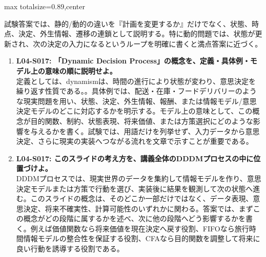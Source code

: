 \begin{minipage}[t]{0.58\textwidth}
\begin{adjustbox}{max totalsize={\textwidth}{0.89\textheight},center}
\begin{minipage}{\textwidth}
試験答案では、静的/動的の違いを『計画を変更するか』だけでなく、状態、時点、決定、外生情報、遷移の連鎖として説明する。特に動的問題では、状態が更新され、次の決定の入力になるというループを明確に書くと満点答案に近づく。\par{}\begin{enumerate}\item \textbf{L04-S017: 「Dynamic Decision Process」の概念を、定義・具体例・モデル上の意味の順に説明せよ。}\\定義としては、dynamismは、時間の進行により状態が変わり、意思決定を繰り返す性質である。。具体例では、配送・在庫・フードデリバリーのような現実問題を用い、状態、決定、外生情報、報酬、または情報モデル/意思決定モデルのどこに対応するかを明示する。モデル上の意味として、この概念が目的関数、制約、状態表現、将来価値、または方策選択にどのような影響を与えるかを書く。試験では、用語だけを列挙せず、入力データから意思決定、さらに現実の実装へつながる流れを文章で示すことが重要である。\item \textbf{L04-S017: このスライドの考え方を、講義全体のDDDMプロセスの中に位置づけよ。}\\DDDMプロセスでは、現実世界のデータを集約して情報モデルを作り、意思決定モデルまたは方策で行動を選び、実装後に結果を観測して次の状態へ進む。このスライドの概念は、そのどこか一部だけではなく、データ表現、意思決定、将来不確実性、計算可能性のいずれかに関わる。答案では、まずこの概念がどの段階に属するかを述べ、次に他の段階へどう影響するかを書く。例えば価値関数なら将来価値を現在決定へ戻す役割、FIFOなら旅行時間情報モデルの整合性を保証する役割、CFAなら目的関数を調整して将来に良い行動を誘導する役割である。\end{enumerate}
\end{minipage}
\end{adjustbox}
\end{minipage}


